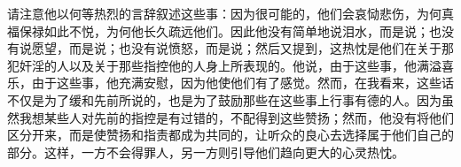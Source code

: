 请注意他以何等热烈的言辞叙述这些事：因为很可能的，他们会哀恸悲伤，为何真福保禄如此不悦，为何他长久疏远他们。因此他没有简单地说泪水，而是说；也没有说愿望，而是说；也没有说愤怒，而是说；然后又提到，这热忱是他们在关于那犯奸淫的人以及关于那些指控他的人身上所表现的。他说，由于这些事，他满溢喜乐，由于这些事，他充满安慰，因为他使他们有了感觉。然而，在我看来，这些话不仅是为了缓和先前所说的，也是为了鼓励那些在这些事上行事有德的人。因为虽然我想某些人对先前的指控是有过错的，不配得到这些赞扬；然而，他没有将他们区分开来，而是使赞扬和指责都成为共同的，让听众的良心去选择属于他们自己的部分。这样，一方不会得罪人，另一方则引导他们趋向更大的心灵热忱。\par

